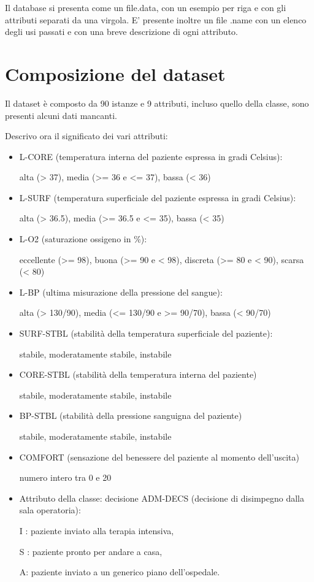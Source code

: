\documentclass[a4paper, 12p]{report}
\begin{document}
Il database si presenta come un file.data, con un esempio per riga e con gli attributi  separati da una virgola. E' presente inoltre un file .name con un elenco degli usi passati e con una breve descrizione di ogni attributo.

\section{Composizione del dataset}
Il dataset è composto da 90 istanze e 9 attributi, incluso quello della classe, sono presenti alcuni dati mancanti.

Descrivo ora il significato dei vari attributi:
\begin{itemize}

	\item L-CORE (temperatura interna del paziente espressa in gradi Celsius):
	
              alta (> 37), media (>= 36 e <= 37), bassa (< 36)
	\item L-SURF (temperatura superficiale del paziente espressa in gradi Celsius):
	
              alta (> 36.5), media (>= 36.5 e <= 35), bassa (< 35)
	\item L-O2 (saturazione ossigeno in \%):
	
              eccellente (>= 98), buona (>= 90 e < 98), discreta (>= 80 e < 90), scarsa (< 80)
	\item L-BP (ultima misurazione della pressione del sangue):
	
              alta (> 130/90), media (<= 130/90 e >= 90/70), bassa (< 90/70)
	\item SURF-STBL (stabilità della temperatura superficiale del paziente):
	
              stabile, moderatamente stabile, instabile
	\item CORE-STBL (stabilità della temperatura interna del paziente)
	
              stabile, moderatamente stabile, instabile
	\item  BP-STBL (stabilità della pressione sanguigna del paziente)
	
             stabile, moderatamente stabile, instabile
	\item COMFORT (sensazione del benessere del paziente al momento dell'uscita) 
	
	numero intero tra 0 e 20
	\item Attributo della classe: decisione ADM-DECS (decisione di disimpegno dalla sala operatoria):
	
              I : paziente inviato alla terapia intensiva,
							
              S : paziente pronto per andare a casa,
							
              A: paziente inviato a un generico piano dell'ospedale.
														
\end{itemize}
\end{document}
